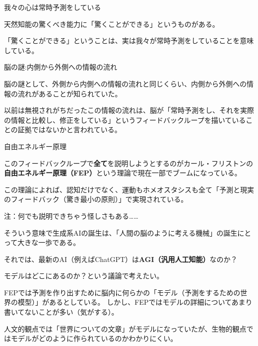 \documentclass[12pt, unicode]{beamer}
\begin{document}
\begin{frame}{我々の心は常時予測をしている}

天然知能の驚くべき能力に「驚くことができる」というものがある。

「驚くことができる」ということは、実は我々が常時予測をしていることを意味している。

\end{frame}

\begin{frame}{脳の謎:内側から外側への情報の流れ}

脳の謎として、外側から内側への情報の流れと同じくらい、内側から外側への情報の流れがあることが知られていた。

以前は無視されがちだったこの情報の流れは、脳が「常時予測をし、それを実際の情報と比較し、修正をしている」というフィードバックループを描いていることの証拠ではないかと言われている。

\end{frame}

\begin{frame}{自由エネルギー原理}

このフィードバックループで\textbf{全て}を説明しようとするのがカール・フリストンの
\textbf{自由エネルギー原理（FEP）}という理論で現在一部でブームになっている。

この理論によれば、認知だけでなく、運動もホメオスタシスも全て「予測と現実のフィードバック（驚き最小の原則）」で実現されている。

注：何でも説明できちゃう怪しさもある……

\end{frame}

\begin{frame}

そういう意味で生成系AIの誕生は、「人間の脳のように考える機械」の誕生にとって大きな一歩である。

\end{frame}

\begin{frame}

それでは、最新のAI（例えばChatGPT）は\textbf{AGI（汎用人工知能）}なのか？

モデルはどこにあるのか？という議論で考えたい。

\end{frame}

\begin{frame}

FEPでは予測を作り出すために脳内に何らかの「モデル（予測をするための世界の模型）」があるとしている。
しかし、FEPではモデルの詳細についてあまり書いてないことが多い（気がする）。

人文的観点では「世界についての文章」がモデルになっていたが、生物的観点ではモデルがどのように作られているのかわかりにくい。

\end{frame}
\end{document}
